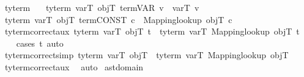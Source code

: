 \begin{isabellebody}
\isanewline
\isanewline
{}\isamarkupfalse%
\ ty{\isacharunderscore}{\kern0pt}term{\isacharprime}{\kern0pt}\ \isanewline
\ \ {\isachardoublequoteopen}ty{\isacharunderscore}{\kern0pt}term{\isacharprime}{\kern0pt}\ varT\ objT\ {\isacharparenleft}{\kern0pt}term{\isachardot}{\kern0pt}VAR\ v{\isacharparenright}{\kern0pt}\ {\isacharequal}{\kern0pt}\ varT\ v{\isachardoublequoteclose}\isanewline
{\isacharbar}{\kern0pt}\ {\isachardoublequoteopen}ty{\isacharunderscore}{\kern0pt}term{\isacharprime}{\kern0pt}\ varT\ objT\ {\isacharparenleft}{\kern0pt}term{\isachardot}{\kern0pt}CONST\ c{\isacharparenright}{\kern0pt}\ {\isacharequal}{\kern0pt}\ Mapping{\isachardot}{\kern0pt}lookup\ objT\ c{\isachardoublequoteclose}\isanewline
\isanewline
{}\isamarkupfalse%
\ ty{\isacharunderscore}{\kern0pt}term{\isacharprime}{\kern0pt}{\isacharunderscore}{\kern0pt}correct{\isacharunderscore}{\kern0pt}aux{\isacharcolon}{\kern0pt}\ {\isachardoublequoteopen}ty{\isacharunderscore}{\kern0pt}term{\isacharprime}{\kern0pt}\ varT\ objT\ t\ {\isacharequal}{\kern0pt}\ ty{\isacharunderscore}{\kern0pt}term\ varT\ {\isacharparenleft}{\kern0pt}Mapping{\isachardot}{\kern0pt}lookup\ objT{\isacharparenright}{\kern0pt}\ t{\isachardoublequoteclose}\isanewline
%
\isadelimproof
\ \ %
\endisadelimproof
%
\isatagproof
{}\isamarkupfalse%
\ {\isacharparenleft}{\kern0pt}cases\ t{\isacharparenright}{\kern0pt}\ auto%
\endisatagproof
{\isafoldproof}%
%
\isadelimproof
\isanewline
%
\endisadelimproof
\isanewline
{}\isamarkupfalse%
\ ty{\isacharunderscore}{\kern0pt}term{\isacharprime}{\kern0pt}{\isacharunderscore}{\kern0pt}correct{\isacharbrackleft}{\kern0pt}simp{\isacharbrackright}{\kern0pt}{\isacharcolon}{\kern0pt}\ {\isachardoublequoteopen}ty{\isacharunderscore}{\kern0pt}term{\isacharprime}{\kern0pt}\ varT\ objT\ {\isacharequal}{\kern0pt}\ ty{\isacharunderscore}{\kern0pt}term\ varT\ {\isacharparenleft}{\kern0pt}Mapping{\isachardot}{\kern0pt}lookup\ objT{\isacharparenright}{\kern0pt}{\isachardoublequoteclose}\isanewline
%
\isadelimproof
\ \ %
\endisadelimproof
%
\isatagproof
{}\isamarkupfalse%
\ ty{\isacharunderscore}{\kern0pt}term{\isacharprime}{\kern0pt}{\isacharunderscore}{\kern0pt}correct{\isacharunderscore}{\kern0pt}aux\ \isamarkupfalse%
\ auto%
\endisatagproof
{\isafoldproof}%
%
\isadelimproof
\isanewline
%
\endisadelimproof
\isanewline
{}\isamarkupfalse%
\ ast{\isacharunderscore}{\kern0pt}domain\ \isanewline
\isanewline
\ \ \isamarkupfalse%

\end{isabellebody}
